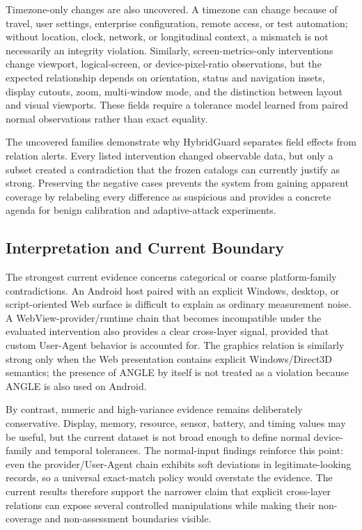 Timezone-only changes are also uncovered. A timezone can change because of travel, user settings, enterprise configuration, remote access, or test automation; without location, clock, network, or longitudinal context, a mismatch is not necessarily an integrity violation. Similarly, screen-metrics-only interventions change viewport, logical-screen, or device-pixel-ratio observations, but the expected relationship depends on orientation, status and navigation insets, display cutouts, zoom, multi-window mode, and the distinction between layout and visual viewports. These fields require a tolerance model learned from paired normal observations rather than exact equality.

The uncovered families demonstrate why HybridGuard separates field effects from relation alerts. Every listed intervention changed observable data, but only a subset created a contradiction that the frozen catalogs can currently justify as strong. Preserving the negative cases prevents the system from gaining apparent coverage by relabeling every difference as suspicious and provides a concrete agenda for benign calibration and adaptive-attack experiments.



\subsection{Interpretation and Current Boundary}

The strongest current evidence concerns categorical or coarse platform-family contradictions. An Android host paired with an explicit Windows, desktop, or script-oriented Web surface is difficult to explain as ordinary measurement noise. A WebView-provider/runtime chain that becomes incompatible under the evaluated intervention also provides a clear cross-layer signal, provided that custom User-Agent behavior is accounted for. The graphics relation is similarly strong only when the Web presentation contains explicit Windows/Direct3D semantics; the presence of ANGLE by itself is not treated as a violation because ANGLE is also used on Android.

By contrast, numeric and high-variance evidence remains deliberately conservative. Display, memory, resource, sensor, battery, and timing values may be useful, but the current dataset is not broad enough to define normal device-family and temporal tolerances. The normal-input findings reinforce this point: even the provider/User-Agent chain exhibits soft deviations in legitimate-looking records, so a universal exact-match policy would overstate the evidence. The current results therefore support the narrower claim that explicit cross-layer relations can expose several controlled manipulations while making their non-coverage and non-assessment boundaries visible.

